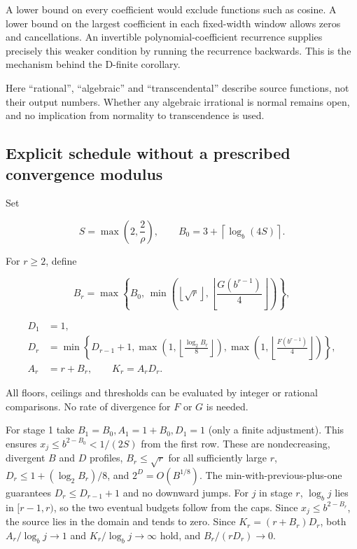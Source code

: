 \documentclass[11pt,a4paper]{article}
\begin{document}
A lower bound on every coefficient would exclude functions such as
cosine. A lower bound on the largest coefficient in each fixed-width
window allows zeros and cancellations. An invertible
polynomial-coefficient recurrence supplies precisely this weaker
condition by running the recurrence backwards. This is the mechanism
behind the D-finite corollary.

Here ``rational'', ``algebraic'' and ``transcendental'' describe source
functions, not their output numbers. Whether any algebraic irrational is
normal remains open, and no implication from normality to transcendence
is used.

\subsection{Explicit schedule without a prescribed convergence
modulus}\label{explicit-schedule-without-a-prescribed-convergence-modulus}

Set

\[
S=\max\left(2,\frac2\rho\right),\qquad B_0=3+\left\lceil\log_b(4S)\right\rceil.
\]

For \(r\ge2\), define

\[
B_r=\max\left\lbrace B_0,\,
\min\left(\left\lfloor\sqrt r\right\rfloor,
\left\lfloor\frac{G(b^{r-1})}{4}\right\rfloor\right)\right\rbrace,
\]

\[
\begin{aligned}
D_1&=1,\\
D_r&=\min\left\lbrace D_{r-1}+1,
\max\left(1,\left\lfloor\frac{\log_2B_r}{8}\right\rfloor\right),
\max\left(1,\left\lfloor\frac{F(b^{r-1})}{4}\right\rfloor\right)
\right\rbrace,\\
A_r&=r+B_r,\qquad K_r=A_rD_r.
\end{aligned}
\]

All floors, ceilings and thresholds can be evaluated by integer or
rational comparisons. No rate of divergence for \(F\) or \(G\) is
needed.

For stage 1 take \(B_1=B_0, A_1=1+B_0, D_1=1\) (only a finite
adjustment). This ensures \(x_j\le b^{2-B_0}< 1/(2S)\) from the first
row. These are nondecreasing, divergent \(B\) and \(D\) profiles,
\(B_r\le \sqrt{r}\) for all sufficiently large \(r\),
\(D_r\le 1+(\log_2 B_r)/8\), and \(2^D=O(B^{1/8})\). The
min-with-previous-plus-one guarantees \(D_r\le D_{r-1}+1\) and no
downward jumps. For \(j\) in stage \(r\), \(\log_b j\) lies in
\([r-1,r)\), so the two eventual budgets follow from the caps. Since
\(x_j\le b^{2-B_r}\), the source lies in the domain and tends to zero.
Since \(K_r=(r+B_r)D_r\), both \(A_r/\log_b j \longrightarrow  1\) and
\(K_r/\log_b j \longrightarrow  \infty\) hold, and
\(B_r/(rD_r)\longrightarrow 0\).
\end{document}
